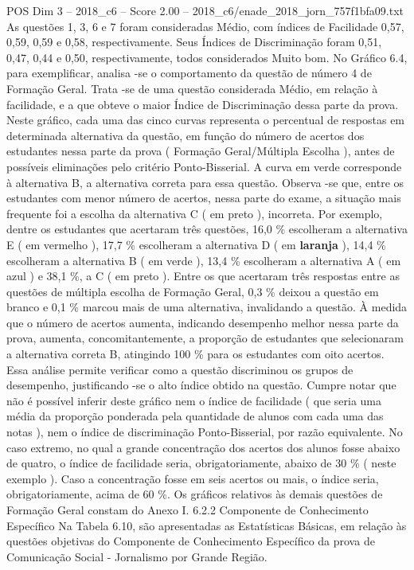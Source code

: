 \begin{textsample}{POS Dim 3 – 2018\_c6 – Score 2.00 – 2018\_c6/enade\_2018\_jorn\_757f1bfa09.txt}
As questões 1, 3, 6 e 7 foram consideradas Médio, com índices de Facilidade 0,57, 0,59, 0,59 e 0,58, respectivamente.
Seus Índices de Discriminação foram 0,51, 0,47, 0,44 e 0,50, respectivamente, todos considerados Muito bom.
No Gráfico 6.4, para exemplificar, analisa -se o comportamento da questão de número 4 de Formação Geral.
Trata -se de uma questão considerada Médio, em relação à facilidade, e a que obteve o maior Índice de Discriminação dessa parte da prova.
Neste gráfico, cada uma das cinco curvas representa o percentual de respostas em determinada alternativa da questão, em função do número de acertos dos estudantes nessa parte da prova ( Formação Geral/Múltipla Escolha ), antes de possíveis eliminações pelo critério Ponto-Bisserial.
A curva em verde corresponde à alternativa B, a alternativa correta para essa questão.
Observa -se que, entre os estudantes com menor número de acertos, nessa parte do exame, a situação mais frequente foi a escolha da alternativa C ( em preto ), incorreta.
Por exemplo, dentre os estudantes que acertaram três questões, 16,0 \% escolheram a alternativa E ( em vermelho ), 17,7 \% escolheram a alternativa D ( em \textbf{laranja} ), 14,4 \% escolheram a alternativa B ( em verde ), 13,4 \% escolheram a alternativa A ( em azul ) e 38,1 \%, a C ( em preto ).
Entre os que acertaram três respostas entre as questões de múltipla escolha de Formação Geral, 0,3 \% deixou a questão em branco e 0,1 \% marcou mais de uma alternativa, invalidando a questão.
À medida que o número de acertos aumenta, indicando desempenho melhor nessa parte da prova, aumenta, concomitantemente, a proporção de estudantes que selecionaram a alternativa correta B, atingindo 100 \% para os estudantes com oito acertos.
Essa análise permite verificar como a questão discriminou os grupos de desempenho, justificando -se o alto índice obtido na questão.
Cumpre notar que não é possível inferir deste gráfico nem o índice de facilidade ( que seria uma média da proporção ponderada pela quantidade de alunos com cada uma das notas ), nem o índice de discriminação Ponto-Bisserial, por razão equivalente.
No caso extremo, no qual a grande concentração dos acertos dos alunos fosse abaixo de quatro, o índice de facilidade seria, obrigatoriamente, abaixo de 30 \% ( neste exemplo ).
Caso a concentração fosse em seis acertos ou mais, o índice seria, obrigatoriamente, acima de 60 \%.
Os gráficos relativos às demais questões de Formação Geral constam do Anexo I. 6.2.2 Componente de Conhecimento Específico Na Tabela 6.10, são apresentadas as Estatísticas Básicas, em relação às questões objetivas do Componente de Conhecimento Específico da prova de Comunicação Social - Jornalismo por Grande Região.

\end{textsample}
